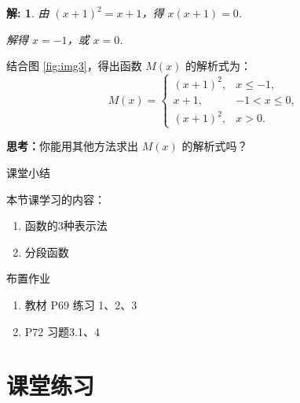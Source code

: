 \documentclass[aspectratio=169,13pt,t] {beamer}
\newtheorem*{solve}{解:}
\theoremstyle{definition}
\begin{document}
\begin{frame}%
	\begin{solve}
		由 \((x+1)^2 = x + 1\)，得 \(x(x+1) = 0\).
		
		解得 \(x = -1\)，或 \(x = 0\).
	\end{solve}
	\vspace{1em}
	\pause
	结合图 \ref{fig:img3}，得出函数 \(M(x)\) 的解析式为：
	\[
		M(x) = \begin{cases}
			(x+1)^2, & x \leqslant -1, \\
			x+1, & -1 < x \leqslant 0, \\
			(x+1)^2, & x > 0.
		\end{cases}
	\]
	\vspace{1em}
	\pause
	\begin{summarybox-answer}
		\textbf{思考：}你能用其他方法求出 \(M(x)\) 的解析式吗？
	\end{summarybox-answer}
\end{frame}

\begin{frame}{课堂小结}
	
	本节课学习的内容：
	
	\begin{enumerate}[(1)]
		\item 函数的3种表示法
		\item 分段函数
	\end{enumerate}
	
\end{frame}

\begin{frame}{布置作业}
	\begin{summarybox}[课后作业]
		\begin{enumerate}
			\item 教材 P69 练习 1、2、3
			\item P72 习题3.1、4
		\end{enumerate}
	\end{summarybox}
\end{frame}

\section{课堂练习}
\end{document}
